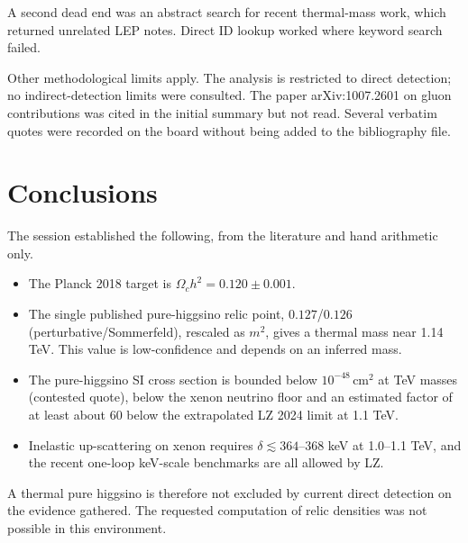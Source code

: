 \documentclass[11pt,a4paper]{article}
\begin{document}
A second dead end was an abstract search for recent thermal-mass work, which returned unrelated LEP notes. Direct ID lookup worked where keyword search failed.

Other methodological limits apply. The analysis is restricted to direct detection; no indirect-detection limits were consulted. The paper arXiv:1007.2601 on gluon contributions was cited in the initial summary but not read. Several verbatim quotes were recorded on the board without being added to the bibliography file.

\section{Conclusions}
The session established the following, from the literature and hand arithmetic only.
\begin{itemize}
\item The Planck 2018 target is $\Omega_c h^2 = 0.120\pm0.001$.
\item The single published pure-higgsino relic point, $0.127$/$0.126$ (perturbative/Sommerfeld), rescaled as $m^2$, gives a thermal mass near 1.14 TeV. This value is low-confidence and depends on an inferred mass.
\item The pure-higgsino SI cross section is bounded below $10^{-48}\,\mathrm{cm^2}$ at TeV masses (contested quote), below the xenon neutrino floor and an estimated factor of at least about 60 below the extrapolated LZ 2024 limit at 1.1 TeV.
\item Inelastic up-scattering on xenon requires $\delta \lesssim 364$--$368$ keV at 1.0--1.1 TeV, and the recent one-loop keV-scale benchmarks are all allowed by LZ.
\end{itemize}
A thermal pure higgsino is therefore not excluded by current direct detection on the evidence gathered. The requested computation of relic densities was not possible in this environment.
\end{document}
